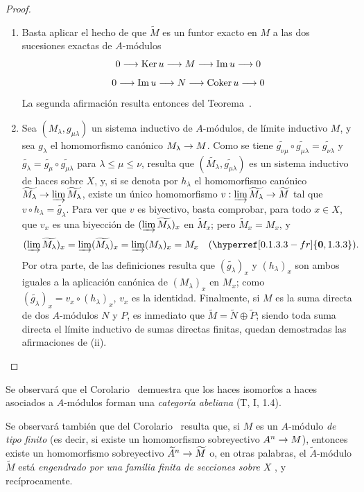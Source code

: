 \documentclass[oneside]{amsart}
\theoremstyle{ega-env-style}
\theoremstyle{ega-thm-env-style}
\theoremstyle{ega-defn-env-style}
\def\leq{\leqslant}                 %
\renewcommand{\to}{\mathchoice{\longrightarrow}{\rightarrow}{\rightarrow}{\rightarrow}}
\newcommand{\oldpage}[2][]{{\marginnote{\normalfont{\textbf{#1}~|~#2}}}\ignorespaces}
\begin{document}
\begin{proof}
\medskip\noindent
\begin{enumerate}
  \item[(i)] Basta aplicar el hecho de que $\widetilde{M}$ es un funtor exacto en $M$  a las dos sucesiones exactas de $A$-módulos
    \[
  0\to\operatorname{Ker}u\to M\to\operatorname{Im}u\to0
\]
    \[
  0\to\operatorname{Im}u\to N\to\operatorname{Coker}u\to0
\]
    La segunda afirmación resulta entonces del Teorema~.
  \item[(ii)] Sea $(M_\lambda,g_{\mu\lambda})$ un sistema inductivo de $A$-módulos, de límite inductivo $M$, y sea $g_\lambda$ el homomorfismo canónico $M_\lambda\to M$.
    Como se tiene $\widetilde{g_{\nu\mu}}\circ\widetilde{g_{\mu\lambda}}
=\widetilde{g_{\nu\lambda}}$ y $\widetilde{g_\lambda}=\widetilde{g_\mu}\circ
\widetilde{g_{\mu\lambda}}$ para $\lambda\leq\mu\leq\nu$, resulta que $(\widetilde{M_\lambda},\widetilde{g_{\mu\lambda}})$ es un sistema inductivo de haces sobre $X$, y, si se denota por $h_\lambda$ el homomorfismo canónico $\widetilde{M_\lambda}\to\varinjlim\widetilde{M_\lambda}$, existe un único homomorfismo $v:\varinjlim\widetilde{M_\lambda}\to\widetilde{M}$ tal que $v\circ h_\lambda=\widetilde{g_\lambda}$.
    Para ver que $v$ es biyectivo, basta comprobar, para todo $x\in X$, que $v_x$ es una biyección de $(\varinjlim\widetilde{M_\lambda})_x$ en $\widetilde{M}_x$;
    pero $\widetilde{M}_x=M_x$, y
    \[
  (\varinjlim\widetilde{M_\lambda})_x
  =\varinjlim(\widetilde{M_\lambda})_x
  =\varinjlim(M_\lambda)_x=M_x
  \quad(\hyperref[0.1.3.3-fr]{\textbf{0}, 1.3.3}).
\]
    Por otra parte, de las definiciones resulta que $(\widetilde{g_\lambda})_x$ y
    $(h_\lambda)_x$ son ambos iguales a la aplicación canónica de $(M_\lambda)_x$ en $M_x$;
    como $(\widetilde{g_\lambda})_x=v_x\circ(h_\lambda)_x$, $v_x$ es la identidad.
\oldpage[I]{88}
    Finalmente, si $M$ es la suma directa de dos $A$-módulos $N$ y $P$, es inmediato que $\widetilde{M}=\widetilde{N}\oplus\widetilde{P}$;
    siendo toda suma directa el límite inductivo de sumas directas finitas, quedan demostradas las afirmaciones de (ii).
\end{enumerate}
\end{proof}

Se observará que el Corolario~ demuestra que los haces isomorfos a haces asociados a $A$-módulos forman una \emph{categoría abeliana} (T, I, 1.4).

Se observará también que del Corolario~ resulta que, si $M$ es un $A$-módulo \emph{de tipo finito} (es decir, si existe un homomorfismo sobreyectivo $A^n\to M$), entonces existe un homomorfismo sobreyectivo $\widetilde{A}^n\to\widetilde{M}$ o, en otras palabras, el $\widetilde{A}$-módulo $\widetilde{M}$ está \emph{engendrado por una familia finita de secciones sobre $X$} , y recíprocamente.
\end{document}
